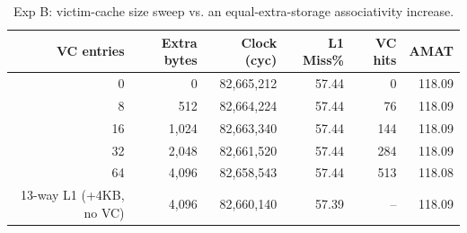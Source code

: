 \begin{table}[H]\centering\small
\begin{tabular}{rrrrrr}\toprule
VC entries & Extra bytes & Clock (cyc) & L1 Miss\% & VC hits & AMAT \\ \midrule
0 & 0 & 82,665,212 & 57.44 & 0 & 118.09 \\
8 & 512 & 82,664,224 & 57.44 & 76 & 118.09 \\
16 & 1,024 & 82,663,340 & 57.44 & 144 & 118.09 \\
32 & 2,048 & 82,661,520 & 57.44 & 284 & 118.09 \\
64 & 4,096 & 82,658,543 & 57.44 & 513 & 118.08 \\
\midrule 13-way L1 (+4KB, no VC) & 4{,}096 & 82,660,140 & 57.39 & -- & 118.09 \\
\bottomrule\end{tabular}
\caption{Exp B: victim-cache size sweep vs. an equal-extra-storage associativity increase.}
\label{tab:expB}\end{table}

